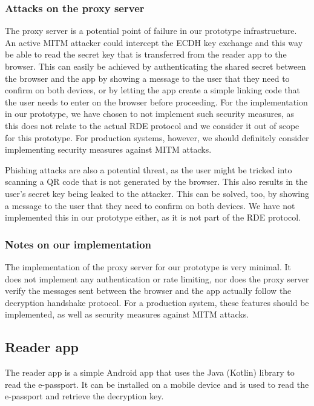 \subsubsection{Attacks on the proxy server}
The proxy server is a potential point of failure in our prototype infrastructure.
An active MITM attacker could intercept the ECDH key exchange and this way be able to read the secret key that is transferred from the reader app to the browser.
This can easily be achieved by authenticating the shared secret between the browser and the app by showing a message to the user that they need to confirm on both devices, or by letting the app create a simple linking code that the user needs to enter on the browser before proceeding.
For the implementation in our prototype, we have chosen to not implement such security measures, as this does not relate to the actual RDE protocol and we consider it out of scope for this prototype.
For production systems, however, we should definitely consider implementing security measures against MITM attacks.

Phishing attacks are also a potential threat, as the user might be tricked into scanning a QR code that is not generated by the browser.
This also results in the user's secret key being leaked to the attacker.
This can be solved, too, by showing a message to the user that they need to confirm on both devices.
We have not implemented this in our prototype either, as it is not part of the RDE protocol.

\subsubsection{Notes on our implementation}
The implementation of the proxy server for our prototype is very minimal.
It does not implement any authentication or rate limiting, nor does the proxy server verify the messages sent between the browser and the app actually follow the decryption handshake protocol.
For a production system, these features should be implemented, as well as security measures against MITM attacks.

\subsection{Reader app}\label{subsec:reader-app}
The reader app is a simple Android app that uses the Java (Kotlin) library to read the e-passport.
It can be installed on a mobile device and is used to read the e-passport and retrieve the decryption key.

